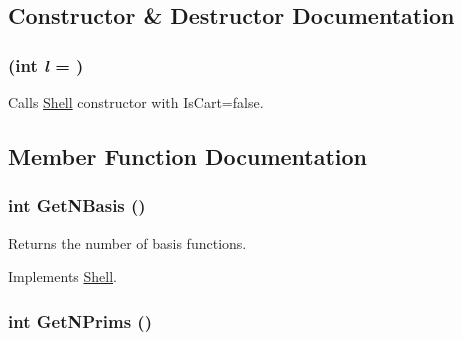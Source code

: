 \subsection{Constructor \& Destructor Documentation}
\hypertarget{classJKBuilder_1_1SphereShell_af92e2c0e6f04dbf41105b543a6eebdcd}{
\subsubsection[{SphereShell}]{ (int {\em l} = {})}}
\label{classJKBuilder_1_1SphereShell_af92e2c0e6f04dbf41105b543a6eebdcd}


Calls \hyperlink{classJKBuilder_1_1Shell}{Shell} constructor with IsCart=false. 

\subsection{Member Function Documentation}
\hypertarget{classJKBuilder_1_1SphereShell_a297c144fb990284ac5973c99cdd55f91}{
\subsubsection[{GetNBasis}]{\setlength{\rightskip}{0pt plus 5cm}int GetNBasis ()}}
\label{classJKBuilder_1_1SphereShell_a297c144fb990284ac5973c99cdd55f91}


Returns the number of basis functions. 

Implements \hyperlink{classJKBuilder_1_1Shell_a1167cdb6f1e1ba08ba6cbffa0b32ca77}{Shell}.\hypertarget{classJKBuilder_1_1Shell_abc886cd4e35d3c56a0250b7d06986f61}{
\subsubsection[{GetNPrims}]{\setlength{\rightskip}{0pt plus 5cm}int GetNPrims ()}}
\label{classJKBuilder_1_1Shell_abc886cd4e35d3c56a0250b7d06986f61}


